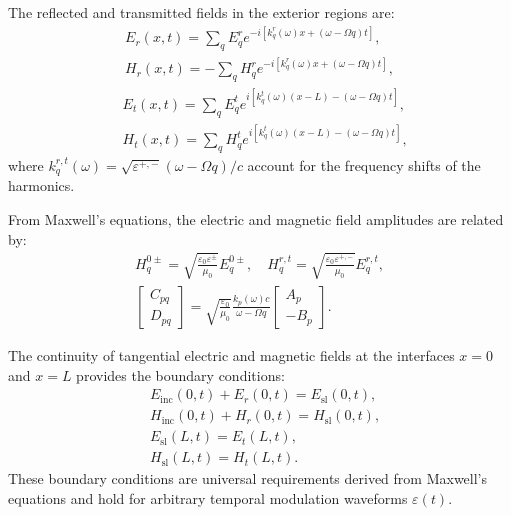 \documentclass[%
 reprint,
 amsmath,amssymb,
 aps,
 prb,
]{revtex4-2}
\newcommand{\corrections}[1]{#1}
\begin{document}
The reflected and transmitted fields in the exterior regions are:
\begin{gather}
    E_{r}(x, t) = \sum_{q} E_{q}^{r} e^{-i\left[k_{q}^{r}(\omega) x + (\omega - \Omega q) t\right]}, \label{eq:reflected_E} \\
    H_{r}(x, t) = -\sum_{q} H_{q}^{r} e^{-i\left[k_{q}^{r}(\omega) x + (\omega - \Omega q) t\right]}, \label{eq:reflected_H}
\end{gather}
\begin{align}
    & E_{t}(x, t) = \sum_{q} E_{q}^{t} e^{i\left[k_{q}^{t}(\omega)(x - L) - (\omega - \Omega q) t\right]}, \label{eq:transmitted_E} \\
    & H_{t}(x, t) = \sum_{q} H_{q}^{t} e^{i\left[k_{q}^{t}(\omega)(x - L) - (\omega - \Omega q) t\right]}, \label{eq:transmitted_H}
\end{align}
where $k_{q}^{r,t}(\omega) = \sqrt{\varepsilon^{+,-}}(\omega - \Omega q) / c$ account for the frequency shifts of the harmonics.


From Maxwell's equations, the electric and magnetic field amplitudes are related by:
\begin{gather}
    H^{0\pm}_{q} = \sqrt{\frac{\varepsilon_{0} \varepsilon^{\pm}}{\mu_{0}}} E^{0\pm}_{q}, \quad H_{q}^{r, t} = \sqrt{\frac{\varepsilon_{0} \varepsilon^{+,-}}{\mu_{0}}} E_{q}^{r, t}, \label{eq:maxwell_relations} \\
    \begin{bmatrix} C_{pq} \\ D_{pq} \end{bmatrix} = \sqrt{\frac{\varepsilon_{0}}{\mu_{0}}} \frac{k_{p}(\omega) c}{\omega - \Omega q} \begin{bmatrix} A_{p} \\ -B_{p} \end{bmatrix}. \label{eq:amplitudes_relation}
\end{gather}

The continuity of tangential electric and magnetic fields at the interfaces $x = 0$ and $x = L$ provides the boundary conditions:
\begin{align}
    & E_{\mathrm{inc}}(0, t) + E_{r}(0, t) = E_{\mathrm{sl}}(0, t), \label{eq:boundary_E_0} \\
    & H_{\mathrm{inc}}(0, t) + H_{r}(0, t) = H_{\mathrm{sl}}(0, t), \label{eq:boundary_H_0} \\
    & E_{\mathrm{sl}}(L, t) = E_{t}(L, t), \label{eq:boundary_E_L}\\
    & H_{\mathrm{sl}}(L, t) = H_{t}(L, t). \label{eq:boundary_H_L}
\end{align}
\corrections{These boundary conditions are universal requirements derived from Maxwell's equations and hold for arbitrary temporal modulation waveforms $\varepsilon(t)$.}
\end{document}
